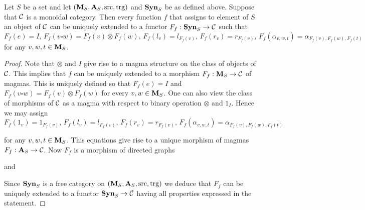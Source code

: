 \begin{proposition}\label{proposition:syntactictensorcategory}
Let $S$ be a set and let $\left(\mathbf{M}_S,\mathbf{A}_S,\mathrm{src},\mathrm{trg}\right)$ and $\mathbf{Syn}_{S}$ be as defined above. Suppose that ${\mathcal C}$ is a monoidal category. Then every function $f$ that assigns to element of $S$ an object of ${\mathcal C}$ can be uniquely extended to a functor $F_f:\mathbf{Syn}_{S} \rightarrow {\mathcal C}$ such that 
$$F_f(e) = I,\,F_f(v\square w) = F_f(v)\otimes F_f(w),\,F_f(l_v) = l_{F_f(v)},\,F_f(r_v) = r_{F_f(v)},\,F_f(\alpha_{v,w,t}) = \alpha_{F_f(v),F_f(w),F_f(t)}$$
for any $v,w,t\in \mathbf{M}_S$.
\end{proposition}
\begin{proof}
Note that $\otimes$ and $I$ give rise to a magma structure on the class of objects of ${\mathcal C}$. This implies that $f$ can be uniquely extended to a morphism $F_f:\mathbf{M}_S\rightarrow {\mathcal C}$ of magmas. This is uniquely defined so that $F_f(e) = I$ and $F_f(v\square w) = F_f(v)\otimes F_f(w)$ for every $v, w\in \mathbf{M}_S$. One can also view the class of morphisms of ${\mathcal C}$ as a magma with respect to binary operation $\otimes$ and $1_I$. Hence we may assign
$$F_f(1_v) = 1_{F_f(v)},\,F_f(l_v) = l_{F_f(v)},\,F_f(r_v) = r_{F_f(v)},\,F_f(\alpha_{v,w,t}) = \alpha_{F_f(v),F_f(w),F_f(t)}$$

for any $v,w,t\in \mathbf{M}_S$. This equations give rise to a unique morphism of magmas $F_f:\mathbf{A}_S\rightarrow {\mathcal C}$. Now $F_f$ is a morphism of directed graphs
\begin{center}
\end{center}
and
\begin{center}
\end{center}
Since $\mathbf{Syn}_S$ is a free category on $\left(\mathbf{M}_S,\mathbf{A}_S,\mathrm{src},\mathrm{trg}\right)$ we deduce that $F_f$ can be uniquely extended to a functor $\mathbf{Syn}_S\rightarrow {\mathcal C}$ having all properties expressed in the statement.
\end{proof}
